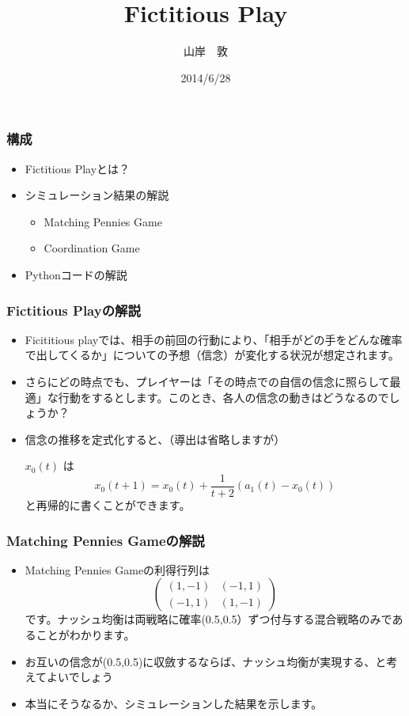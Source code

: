 \documentclass[dvipdfmx,fleqn]{beamer}
\title{\Large Fictitious Play}
\author{\large 山岸　敦}
\date{\small 2014/6/28}
\begin{document}
\sffamily
\gtfamily


\begin{frame}
  \titlepage
  \thispagestyle{empty}
\end{frame}

\setcounter{framenumber}{0}




\begin{frame}
\frametitle{構成}
\begin{itemize}\setlength{\parskip}{0.5em}
\item
Fictitious Playとは？
\item
シミュレーション結果の解説
 \begin{itemize}\setlength{\parskip}{0.5em}
 \item
Matching Pennies Game
 \item
 Coordination Game
 \end{itemize}

\item
Pythonコードの解説
\end{itemize}
\end{frame}



\begin{frame}
\frametitle{Fictitious Playの解説}
\begin{itemize}\setlength{\parskip}{0.5em}
\item
Ficititious playでは、相手の前回の行動により、「相手がどの手をどんな確率で出してくるか」についての予想（信念）が変化する状況が想定されます。\pause

\item
さらにどの時点でも、プレイヤーは「その時点での自信の信念に照らして最適」な行動をするとします。このとき、各人の信念の動きはどうなるのでしょうか？\pause
\item
信念の推移を定式化すると、（導出は省略しますが） 

$x_0(t)$ は
\[
x_0(t+1)
= x_0(t) + \frac{1}{t+2} (a_1(t) - x_0(t))
\]
と再帰的に書くことができます。 



\end{itemize}
\end{frame}

\begin{frame}
\frametitle{Matching Pennies Gameの解説}
\begin{itemize}\setlength{\parskip}{0.5em}
\item
Matching Pennies Gameの利得行列は
\[\left( \begin{array}{cc}
(1,-1) & (-1,1) \\
(-1,1) & (1,-1) 
\end{array} \right)\]
です。ナッシュ均衡は両戦略に確率(0.5,0.5）ずつ付与する混合戦略のみであることがわかります。\pause

\item
お互いの信念が(0.5,0.5)に収斂するならば、ナッシュ均衡が実現する、と考えてよいでしょう\pause
\item
本当にそうなるか、シミュレーションした結果を示します。



\end{itemize}
\end{frame}
\end{document}
